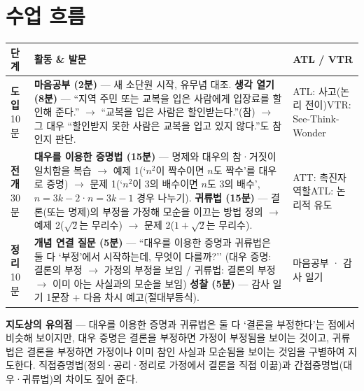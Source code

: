 \documentclass[11pt,a4paper]{article}
\begin{document}
\section{수업 흐름}
\begin{tabularx}{\linewidth}{@{}>{\centering\arraybackslash}p{1.6cm}X>{\raggedright\arraybackslash\small}p{3.1cm}@{}}
\toprule
\textbf{단계} & \textbf{활동 \& 발문} & \textbf{ATL / VTR} \\
\midrule
\textcolor{goldstrong}{\textbf{도입}}\newline\footnotesize 10분 &
\textbf{마음공부 (2분)} --- 새 소단원 시작, 유무념 대조.\newline
\textbf{생각 열기 (8분)} --- ``지역 주민 또는 교복을 입은 사람에게 입장료를 할인해 준다.'' $\to$ ``교복을 입은 사람은 할인받는다.''(참) $\to$ 그 대우 ``할인받지 못한 사람은 교복을 입고 있지 않다.''도 참인지 판단. &
ATL: 사고(논리 전이)\newline VTR: See-Think-Wonder \\
\addlinespace
\textcolor{goldstrong}{\textbf{전개}}\newline\footnotesize 30분 &
\textbf{대우를 이용한 증명법 (15분)} --- 명제와 대우의 참·거짓이 일치함을 복습 $\to$ 예제 1(`$n^2$이 짝수이면 $n$도 짝수'를 대우로 증명) $\to$ 문제 1(`$n^2$이 3의 배수이면 $n$도 3의 배수', $n=3k-2$·$n=3k-1$ 경우 나누기).\newline
\textbf{귀류법 (15분)} --- 결론(또는 명제)의 부정을 가정해 모순을 이끄는 방법 정의 $\to$ 예제 2($\sqrt2$는 무리수) $\to$ 문제 2($1+\sqrt2$는 무리수). &
ATT: 촉진자 역할\newline ATL: 논리적 유도 \\
\addlinespace
\textcolor{goldstrong}{\textbf{정리}}\newline\footnotesize 10분 &
\textbf{개념 연결 질문 (5분)} --- ``대우를 이용한 증명과 귀류법은 둘 다 `부정'에서 시작하는데, 무엇이 다를까?'' (대우 증명: 결론의 부정 $\to$ 가정의 부정을 보임 / 귀류법: 결론의 부정 $\to$ 이미 아는 사실과의 모순을 보임)\newline
\textbf{성찰 (5분)} --- 감사 일기 1문장 + 다음 차시 예고(절대부등식). &
마음공부 · 감사 일기 \\
\bottomrule
\end{tabularx}

\begin{calloutbox}
\textbf{지도상의 유의점} --- 대우를 이용한 증명과 귀류법은 둘 다 `결론을 부정한다'는 점에서 비슷해 보이지만, 대우 증명은 결론을 부정하면 가정이 부정됨을 보이는 것이고, 귀류법은 결론을 부정하면 가정이나 이미 참인 사실과 모순됨을 보이는 것임을 구별하여 지도한다. 직접증명법(정의·공리·정리로 가정에서 결론을 직접 이끎)과 간접증명법(대우·귀류법)의 차이도 짚어 준다.
\end{calloutbox}
\end{document}
